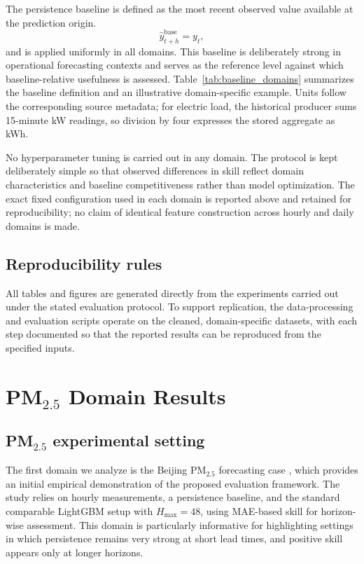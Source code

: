 \documentclass[pdflatex]{sn-jnl}
\begin{document}
The persistence baseline is defined as the most recent observed value
available at the prediction origin.
\begin{equation}
\hat{y}^{\mathrm{base}}_{t+h} = y_t,
\end{equation}
and is applied uniformly in all domains. This baseline is deliberately
strong in operational forecasting contexts and serves as the reference
level against which baseline-relative usefulness is assessed.
Table~\ref{tab:baseline_domains} summarizes the baseline definition and an
illustrative domain-specific example. Units follow the corresponding source
metadata; for electric load, the historical producer sums 15-minute kW
readings, so division by four expresses the stored aggregate as kWh.



No hyperparameter tuning is carried out in any domain. The protocol is
kept deliberately simple so that observed differences in skill reflect
domain characteristics and baseline competitiveness rather than model
optimization. The exact fixed configuration used in each domain is reported
above and retained for reproducibility; no claim of identical feature
construction across hourly and daily domains is made.

\subsection{Reproducibility rules}

All tables and figures are generated directly from the experiments
carried out under the stated evaluation protocol. To support
replication, the data-processing and evaluation scripts operate on the
cleaned, domain-specific datasets, with each step documented so that
the reported results can be reproduced from the specified inputs.


\section{PM$_{2.5}$ Domain Results}

\subsection{\texorpdfstring{PM$_{2.5}$}{PM2.5} experimental setting}

The first domain we analyze is the Beijing PM$_{2.5}$ forecasting case \citep{chen2015beijingpm25}, which provides an initial empirical demonstration of the proposed evaluation framework. The study relies on hourly measurements, a persistence baseline, and the standard comparable LightGBM setup with $H_{\max}=48$, using MAE-based skill for horizon-wise assessment. This domain is particularly informative for highlighting settings in which persistence remains very strong at short lead times, and positive skill appears only at longer horizons.
\end{document}
